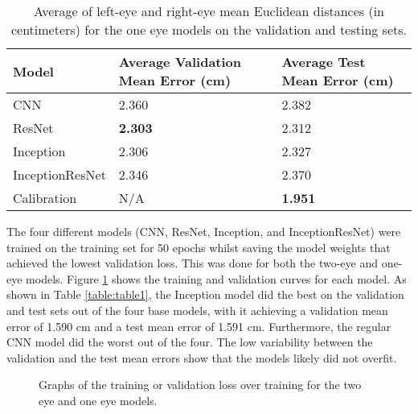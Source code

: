 \documentclass{article}
\begin{document}
\begin{table}
  \caption{Average of left-eye and right-eye mean Euclidean distances (in centimeters) for the one eye models on the validation and testing sets.}
  \centering
  \begin{tabular}{lll}
    \toprule
    Model     & Average Validation Mean Error (cm)   & Average Test Mean Error (cm) \\
    \midrule
    CNN & 2.360 & 2.382 \\
    ResNet & \textbf{2.303} & 2.312 \\
    Inception & 2.306 & 2.327 \\
    InceptionResNet & 2.346 & 2.370 \\
    Calibration & N/A & \textbf{1.951} \\
    
    \bottomrule
  \end{tabular}
  \label{table:table3}
\end{table}





The four different models (CNN, ResNet, Inception, and InceptionResNet) were trained on the training set for 50 epochs whilst saving the model weights that achieved the lowest validation loss. This was done for both the two-eye and one-eye models. Figure \ref{fig:graphs} shows the training and validation curves for each model. As shown in Table \ref{table:table1}, the Inception model did the best on the validation and test sets out of the four base models, with it achieving a validation mean error of 1.590 cm and a test mean error of 1.591 cm. Furthermore, the regular CNN model did the worst out of the four. The low variability between the validation and the test mean errors show that the models likely did not overfit.

\begin{figure}[h]
\centering
{}
\qquad
{}
\caption{Graphs of the training or validation loss over training for the two eye and one eye models.}
\label{fig:graphs}
\end{figure}
\end{document}
